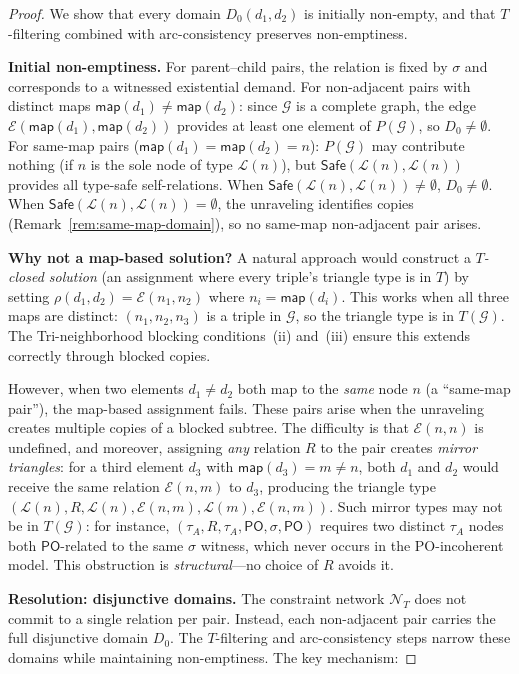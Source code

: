 \documentclass[a4paper,11pt]{article}
\theoremstyle{definition}
\newcommand{\PO}{\ensuremath{\mathsf{PO}}}
\newcommand{\Safe}{\ensuremath{\mathsf{Safe}}}
\newcommand{\GG}{\ensuremath{\mathcal{G}}}
\newcommand{\LL}{\ensuremath{\mathcal{L}}}
\newcommand{\EE}{\ensuremath{\mathcal{E}}}
\newcommand{\NN}{\ensuremath{\mathcal{N}}}
\begin{document}
\begin{proof}
We show that every domain $D_0(d_1, d_2)$ is initially
non-empty, and that $T$-filtering combined with arc-consistency
preserves non-emptiness.

\medskip\noindent\textbf{Initial non-emptiness.}\;
For parent--child pairs, the relation is fixed by $\sigma$
and corresponds to a witnessed existential demand.
For non-adjacent pairs with distinct maps
$\mathsf{map}(d_1) \neq \mathsf{map}(d_2)$: since $\GG$
is a complete graph, the edge $\EE(\mathsf{map}(d_1),
\mathsf{map}(d_2))$ provides at least one element of
$P(\GG)$, so $D_0 \neq \emptyset$.
For same-map pairs ($\mathsf{map}(d_1) = \mathsf{map}(d_2)
= n$): $P(\GG)$ may contribute nothing (if $n$ is the sole
node of type $\LL(n)$), but $\Safe(\LL(n), \LL(n))$ provides
all type-safe self-relations.  When $\Safe(\LL(n), \LL(n))
\neq \emptyset$, $D_0 \neq \emptyset$.  When
$\Safe(\LL(n), \LL(n)) = \emptyset$, the
unraveling identifies copies
(Remark~\ref{rem:same-map-domain}), so no same-map
non-adjacent pair arises.

\medskip\noindent\textbf{Why not a map-based solution?}\;
A natural approach would construct a \emph{$T$-closed solution}
(an assignment where every triple's triangle type is in $T$)
by setting $\rho(d_1, d_2) = \EE(n_1, n_2)$ where $n_i =
\mathsf{map}(d_i)$.  This works when all three maps are
distinct: $(n_1, n_2, n_3)$ is a triple in $\GG$, so the
triangle type is in $T(\GG)$.  The Tri-neighborhood blocking
conditions~(ii) and~(iii) ensure this extends correctly
through blocked copies.

However, when two elements $d_1 \neq d_2$ both map to the
\emph{same} node $n$ (a ``same-map pair''), the map-based
assignment fails.  These pairs arise when the unraveling
creates multiple copies of a blocked subtree.  The difficulty
is that $\EE(n, n)$ is undefined, and moreover, assigning
\emph{any} relation $R$ to the pair creates \emph{mirror
triangles}: for a third element $d_3$ with $\mathsf{map}(d_3)
= m \neq n$, both $d_1$ and $d_2$ would receive the same
relation $\EE(n, m)$ to $d_3$, producing the triangle type
$(\LL(n), R, \LL(n), \EE(n,m), \LL(m), \EE(n,m))$.
Such mirror types may not be in $T(\GG)$: for instance,
$(\tau_A, R, \tau_A, \PO, \sigma, \PO)$ requires two
distinct $\tau_A$ nodes both $\PO$-related to the same
$\sigma$ witness, which never occurs in the PO-incoherent
model.  This obstruction is \emph{structural}---no choice
of $R$ avoids it.

\medskip\noindent\textbf{Resolution: disjunctive domains.}\;
The constraint network $\NN_T$ does not commit to a single
relation per pair.  Instead, each non-adjacent pair carries
the full disjunctive domain $D_0$.  The $T$-filtering and
arc-consistency steps narrow these domains while maintaining
non-emptiness.  The key mechanism:


\end{proof}
\end{document}
